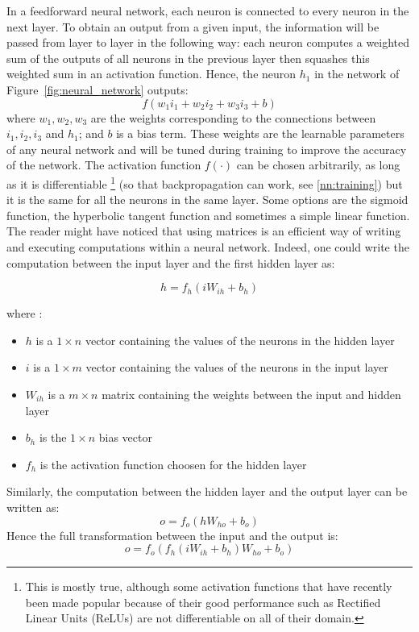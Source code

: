 In a feedforward neural network, each neuron is connected to every neuron in 
the next layer.  To obtain an output from a given input,
the information will be passed from layer to layer in the following way: 
each neuron computes a weighted sum of the outputs of all neurons in the
previous layer then squashes this weighted sum in an activation function.
Hence, the neuron $h_1$ in the network of Figure~\ref{fig:neural_network}
outputs:
$$ f(w_1i_1 + w_2i_2 + w_3i_3 + b) $$
where $w_1, w_2, w_3$ are the weights  corresponding to the
connections between $i_1, i_2, i_3$ and $h_1$; and $b$ is a bias term. 
These weights are the learnable parameters of any neural network and will be 
tuned during training to improve the accuracy of the network. 
The activation function $f(\cdot)$ can be chosen arbitrarily, as long as it 
is differentiable \footnote{This is mostly true, although some activation
functions that have recently been made popular because of their good
performance such as Rectified Linear Units (ReLUs) \cite{relus} are not 
differentiable on all of their domain.}
(so that backpropagation can work, see \ref{nn:training})
but it is the same for all the neurons in the same layer. Some options are
the sigmoid function, the hyperbolic tangent function and sometimes a simple
linear function.\\

The reader might have noticed that using matrices is an efficient way of writing
and executing computations within a neural network. Indeed, one could write
the computation between the input layer and the first hidden layer as: 

$$ h = f_h(iW_{ih} + b_h) $$

\noindent where : 
\begin{itemize}
	\item $h$ is a $1\times n$ vector containing the values of the neurons 
		in the hidden layer
	\item $i$ is a $1\times m$ vector containing the values of the neurons
		in the input layer
	\item $W_{ih}$ is a $m\times n$ matrix containing the weights between
		the input and hidden layer
	\item $b_h$ is the $1\times n$ bias vector 
	\item $f_h$ is the activation function choosen for the hidden layer
\end{itemize}

Similarly, the computation between the hidden layer and the output layer
can be written as:
$$ o = f_o(hW_{ho} + b_o) $$
Hence the full transformation between the input and the output is:
$$ o = f_o\left(f_h(iW_{ih} + b_h)W_{ho} + b_o\right) $$


